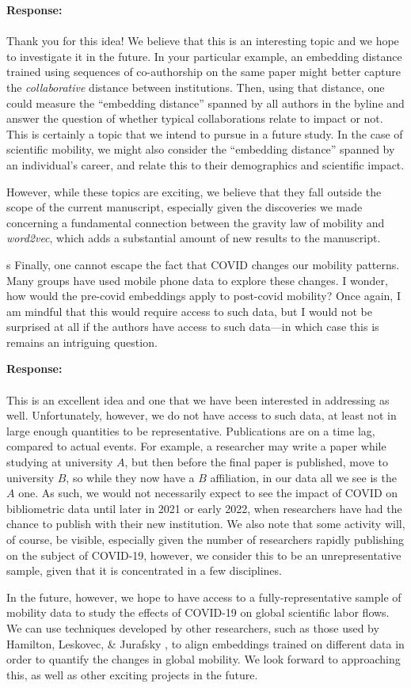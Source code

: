 \documentclass[12pt,draft,a4paper]{article}
\newcounter{comment}[subsection]
\newcommand{\response}[1]{{\noindent \textbf{Response:} \\ \\ \noindent #1}}
\newcommand{\rcomment}[1]{%
\vspace{10pt}
\begin{sectionbox}
s #1
\end{sectionbox}
}
\begin{document}
\response{Thank you for this idea!
	We believe that this is an interesting topic and we hope to investigate it in the future.
	In your particular example, an embedding distance trained using sequences of co-authorship on the same paper might better capture the \textit{collaborative} distance between institutions.
	Then, using that distance, one could measure the ``embedding distance'' spanned by all authors in the byline and answer the question of whether typical collaborations relate to impact or not.
	This is certainly a topic that  we intend to pursue in a future study.
	In the case of scientific mobility, we might also consider the ``embedding distance'' spanned by an individual's career, and relate this to their demographics and scientific impact.

	However, while these topics are exciting, we believe that they fall outside the scope of the current manuscript, especially given the discoveries we made concerning a fundamental connection between the gravity law of mobility and \textit{word2vec}, which adds a substantial amount of new results to the manuscript.
}


\rcomment{
	Finally, one cannot escape the fact that COVID changes our mobility patterns. Many groups have used mobile phone data to explore these changes. I wonder, how would the pre-covid embeddings apply to post-covid mobility? Once again, I am mindful that this would require access to such data, but I would not be surprised at all if the authors have access to such data—in which case this is remains an intriguing question.
}

\response{This is an excellent idea and one that we have been interested in addressing as well.
	Unfortunately, however, we do not have access to such data, at least not in large enough quantities to be representative.
	Publications are on a time lag, compared to actual events.
	For example, a researcher may write a paper while studying at university $A$, but then before the final paper is published, move to university $B$, so while they now have a $B$ affiliation, in our data all we see is the $A$ one.
	As such, we would not necessarily expect to see the impact of COVID on bibliometric data until later in 2021 or early 2022, when researchers have had the chance to publish with their new institution.
	We also note that some activity will, of course, be visible, especially given the number of researchers rapidly publishing on the subject of COVID-19, however, we consider this to be an unrepresentative sample, given that it is concentrated in a few disciplines.

	In the future, however, we hope to have access to a fully-representative sample of mobility data to study the effects of COVID-19 on global scientific labor flows.
	We can use techniques developed by other researchers, such as those used by Hamilton, Leskovec, \& Jurafsky \autocite{hamilton-etal-2016-diachronic}, to align embeddings trained on different data in order to quantify the changes in global mobility.
	We look forward to approaching this, as well as other exciting projects in the future.
}
\end{document}
